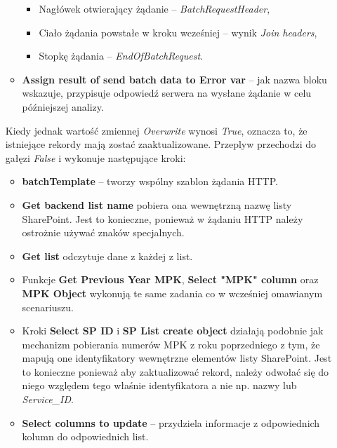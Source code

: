 \begin{enumerate}
\begin{itemize}
                    \begin{itemize}
                        \item Nagłówek otwierający żądanie -- \emph{BatchRequestHeader},
                        \item Ciało żądania powstałe w kroku wcześniej -- wynik \emph{Join headers},
                        \item Stopkę żądania -- \emph{EndOfBatchRequest}.
                    \end{itemize}
              \item \textbf{Assign result of send batch data to Error var} -- jak nazwa bloku wskazuje, przypisuje odpowiedź serwera na wysłane żądanie w celu późniejszej analizy.
          \end{itemize}

          Kiedy jednak wartość zmiennej \emph{Overwrite} wynosi \emph{True}, oznacza to, że istniejące rekordy mają zostać zaaktualizowane. Przeplyw przechodzi do gałęzi \emph{False} i wykonuje następujące kroki:
          \begin{itemize}
              \item \textbf{batchTemplate} -- tworzy wspólny szablon żądania HTTP.
              \item \textbf{Get backend list name} pobiera ona wewnętrzną nazwę listy SharePoint. Jest to konieczne, ponieważ w żądaniu HTTP należy ostrożnie używać znaków specjalnych.
              \item \textbf{Get list} odczytuje dane z każdej z list.
          \end{itemize}
          \begin{itemize}[label=\textasteriskcentered]
              \item Funkcje \textbf{Get Previous Year MPK}, \textbf{Select "MPK" column} oraz \textbf{MPK Object} wykonują te same zadania co w wcześniej omawianym scenariuszu.
          \end{itemize}
          \begin{itemize}
              \item Kroki \textbf{Select SP ID} i \textbf{SP List create object} działają podobnie jak mechanizm pobierania numerów MPK z roku poprzedniego z tym, że mapują one identyfikatory wewnętrzne elementów listy SharePoint. Jest to konieczne ponieważ aby zaktualizować rekord, należy odwołać się do niego względem tego właśnie identyfikatora a nie np. nazwy lub \emph{Service\_ID}.
              \item \textbf{Select columns to update} -- przydziela informacje z odpowiednich kolumn do odpowiednich list.

\end{itemize}
\end{enumerate}

